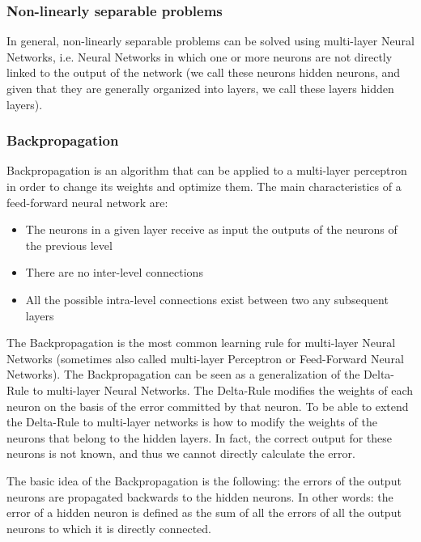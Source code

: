 \subsubsection{Non-linearly separable problems}

In general, non-linearly separable problems can be solved using multi-layer
Neural Networks, i.e. Neural Networks in which one or more neurons are
not directly linked to the output of the network (we call these neurons
hidden neurons, and given that they are generally organized into layers, we
call these layers hidden layers).


\subsubsection{Backpropagation}

Backpropagation is an algorithm that can be applied to a multi-layer perceptron in order to change its weights and optimize them. The main characteristics of a feed-forward neural network are:

\begin{itemize}
    \item The neurons in a given layer receive as input the outputs of the neurons of the previous level
    \item There are no inter-level connections
    \item All the possible intra-level connections exist between two any subsequent layers
\end{itemize}

The Backpropagation is the most common learning rule for multi-layer
Neural Networks (sometimes also called multi-layer Perceptron or
Feed-Forward Neural Networks).
The Backpropagation can be seen as a generalization of the Delta-Rule to
multi-layer Neural Networks.
The Delta-Rule modifies the weights of each neuron on the basis of the
error committed by that neuron.
To be able to extend the Delta-Rule to multi-layer networks is how to
modify the weights of the neurons that belong to the hidden layers.
In fact, the correct output for these neurons is not known, and thus
we cannot directly calculate the error.

\vspace{10pt}

The basic idea of the Backpropagation is the following:
the errors of the output neurons are propagated backwards to the hidden
neurons.
In other words:
the error of a hidden neuron is defined as the sum of all the errors of all
the output neurons to which it is directly connected.

